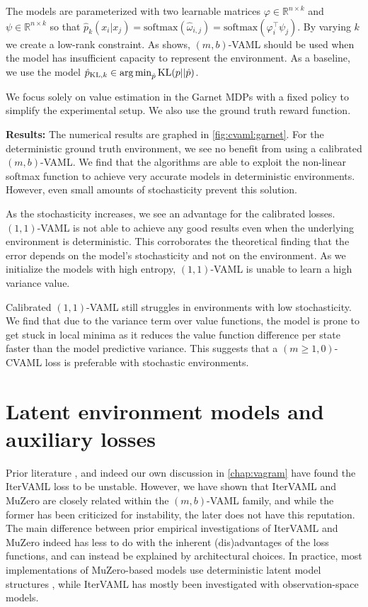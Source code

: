The models are parameterized with two learnable matrices $\varphi \in \mathbb{R}^{n\times k}$ and $\psi \in \mathbb{R}^{n\times k}$ so that $\hat{p}_k(x_i| x_j)  = \mathrm{softmax}(\hat{\omega}_{i,j}) = \mathrm{softmax}(\varphi_i^\top \psi_j)$.
By varying $k$ we create a low-rank constraint.
As \textcite{vaml} shows, $(m,b)$-VAML should be used when the model has insufficient capacity to represent the environment.
As a baseline, we use the model $\hat{p}_{\mathrm{KL}, k}\in \operatorname*{arg\,min}_{\hat{p}} \mathrm{KL}(p||\hat{p})$.

We focus solely on value estimation in the Garnet MDPs with a fixed policy to simplify the experimental setup.
We also use the ground truth reward function.

\textbf{Results:}
The numerical results are graphed in \autoref{fig:cvaml:garnet}.
For the deterministic ground truth environment, we see no benefit from using a calibrated $(m,b)$-VAML.
We find that the algorithms are able to exploit the non-linear softmax function to achieve very accurate models in deterministic environments.
However, even small amounts of stochasticity prevent this solution.

As the stochasticity increases, we see an advantage for the calibrated losses.
$(1,1)$-VAML is not able to achieve any good results even when the underlying environment is deterministic.
This corroborates the theoretical finding that the error depends on the model's stochasticity and not on the environment.
As we initialize the models with high entropy, $(1,1)$-VAML is unable to learn a high variance value.

Calibrated $(1,1)$-VAML still struggles in environments with low stochasticity.
We find that due to the variance term over value functions, the model is prone to get stuck in local minima as it reduces the value function difference per state faster than the model predictive variance.
This suggests that a $(m\geq1,0)$-CVAML loss is preferable with stochastic environments.

\section{Latent environment models and auxiliary losses}
Prior literature \parencite{lovatto2020decision}, and indeed our own discussion in \autoref{chap:vagram} have found the IterVAML loss to be unstable.
However, we have shown that IterVAML and MuZero are closely related within the $(m,b)$-VAML family, and while the former has been criticized for instability, the later does not have this reputation.
The main difference between prior empirical investigations of IterVAML and MuZero indeed has less to do with the inherent (dis)advantages of the loss functions, and can instead be explained by architectural choices.
In practice, most implementations of MuZero-based models use deterministic latent model structures \cite{schrittwieser2020mastering,ye2021mastering,hansen2022temporal,antonoglou2022planning}, while IterVAML has mostly been investigated with observation-space models.

